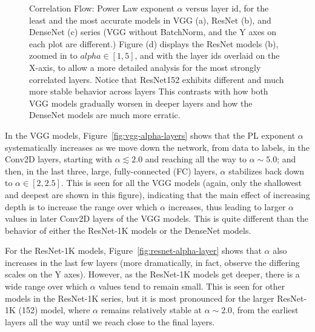 \begin{figure}[t]
{}    
    \caption{Correlation Flow: Power Law exponent $\alpha$ versus layer id, for the least and the most accurate
      models in VGG (a), ResNet (b), and DenseNet (c) series (VGG without BatchNorm, and the Y axes on each plot are different.)  
             Figure (d) displays the ResNet models (b), zoomed in to $alpha\in[1,5]$, and with the layer ids overlaid on the X-axis, to
             allow a more detailed analysis for the most strongly correlated layers.
             Notice that ResNet152 exhibits different and much more stable behavior across layers
             This contrasts with how both VGG models gradually worsen in deeper layers and how the DenseNet models are much more erratic.  
            }
    \label{fig:3models-alpha-layers}
\end{figure}

In the VGG models, Figure~\ref{fig:vgg-alpha-layers} shows that the PL exponent $\alpha$ systematically increases as we move down the network, from data to labels, in the Conv2D layers, starting with $\alpha\lesssim 2.0$ and reaching all the way to $\alpha\sim 5.0$; and then, in the last three, large, fully-connected (FC) layers, $\alpha$ stabilizes back down to $\alpha\in[2,2.5]$.
This is seen for all the VGG models (again, only the shallowest and deepest are shown in this figure), indicating that the main effect of increasing depth is to increase the range over which $\alpha$ increases, thus leading to larger $\alpha$ values in later Conv2D layers of the VGG models.
This is quite different than the behavior of either the ResNet-1K models or the DenseNet models.

For the ResNet-1K models, Figure~\ref{fig:resnet-alpha-layer} shows that $\alpha$ also increases in the last few layers (more dramatically, in fact, observe the differing scales on the Y axes).
However, as the ResNet-1K models get deeper, there is a wide range over which $\alpha$ values tend to remain small.
This is seen for other models in the ResNet-1K series, but it is most pronounced for the larger ResNet-1K (152) model, where $\alpha$ remains relatively stable at $\alpha\sim 2.0$, from the earliest layers all the way until we reach close to the final layers.  

